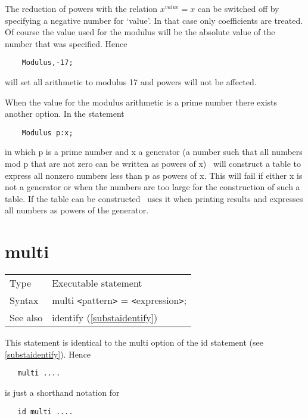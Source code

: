\noindent The reduction of powers with the relation $x^{value}=x$ can be 
switched off by specifying a negative number for `value'. In that case only 
coefficients are treated. Of course the value used for the modulus will be 
the absolute value of the number that was specified. Hence
\begin{verbatim}
    Modulus,-17;
\end{verbatim}
will set all arithmetic to modulus 17 and powers will not be affected.

\noindent When the value for the modulus arithmetic is a prime 
number there exists another option. In the statement
\begin{verbatim}
    Modulus p:x;
\end{verbatim}
in which p is a prime number and x a generator (a number such that all 
numbers mod p that are not zero can be written as powers of x) \FORM\ will 
construct a table to express all nonzero numbers less than p as powers of 
x. This will fail if either x is not a generator or when the numbers are 
too large for the construction of such a table. If the table can be 
constructed \FORM\ uses it when printing results and expresses all numbers as 
powers of the generator.\vspace{10mm}

%
%
 
\section{multi}
\label{substamulti}

\noindent \begin{tabular}{ll}
Type & Executable statement\\
Syntax & multi {\tt<}pattern{\tt>} = {\tt<}expression{\tt>};
\\ See also & identify (\ref{substaidentify})
\end{tabular} \vspace{4mm}

\noindent This statement is identical to the multi option of 
the id statement (see \ref{substaidentify}). Hence
\begin{verbatim}
   multi ....
\end{verbatim}
is just a shorthand notation for
\begin{verbatim}
   id multi ....
\end{verbatim}
\vspace{10mm}

